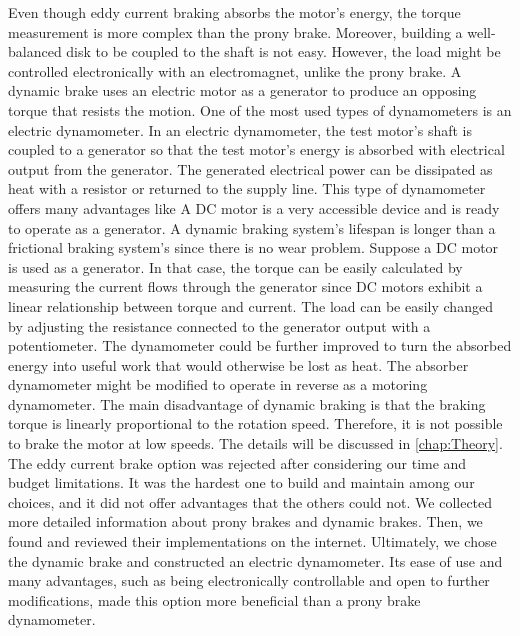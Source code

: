 {}Even though eddy current braking absorbs the motor's energy, the torque measurement is more complex than the prony brake. Moreover, building a well-balanced disk to be coupled to the shaft is not easy. However, the load might be controlled electronically with an electromagnet, unlike the prony brake.\markdownRendererInterblockSeparator
{}\markdownRendererInterblockSeparator
{}A dynamic brake uses an electric motor as a generator to produce an opposing torque that resists the motion. One of the most used types of dynamometers is an electric dynamometer. In an electric dynamometer, the test motor's shaft is coupled to a generator so that the test motor's energy is absorbed with electrical output from the generator. The generated electrical power can be dissipated as heat with a resistor or returned to the supply line.\markdownRendererInterblockSeparator
{}This type of dynamometer offers many advantages like\markdownRendererInterblockSeparator
{}\markdownRendererUlBeginTight
\markdownRendererUlItem A DC motor is a very accessible device and is ready to operate as a generator.\markdownRendererUlItemEnd 
\markdownRendererUlItem A dynamic braking system's lifespan is longer than a frictional braking system's since there is no wear problem.\markdownRendererUlItemEnd 
\markdownRendererUlItem Suppose a DC motor is used as a generator. In that case, the torque can be easily calculated by measuring the current flows through the generator since DC motors exhibit a linear relationship between torque and current.\markdownRendererUlItemEnd 
\markdownRendererUlItem The load can be easily changed by adjusting the resistance connected to the generator output with a potentiometer.\markdownRendererUlItemEnd 
\markdownRendererUlItem The dynamometer could be further improved to turn the absorbed energy into useful work that would otherwise be lost as heat.\markdownRendererUlItemEnd 
\markdownRendererUlItem The absorber dynamometer might be modified to operate in reverse as a motoring dynamometer.\markdownRendererUlItemEnd 
\markdownRendererUlEndTight \markdownRendererInterblockSeparator
{}The main disadvantage of dynamic braking is that the braking torque is linearly proportional to the rotation speed. Therefore, it is not possible to brake the motor at low speeds. The details will be discussed in \autoref{chap:Theory}.\markdownRendererInterblockSeparator
{}\markdownRendererInterblockSeparator
{}The eddy current brake option was rejected after considering our time and budget limitations. It was the hardest one to build and maintain among our choices, and it did not offer advantages that the others could not.\markdownRendererInterblockSeparator
{}We collected more detailed information about prony brakes and dynamic brakes. Then, we found and reviewed their implementations on the internet. Ultimately, we chose the dynamic brake and constructed an electric dynamometer. Its ease of use and many advantages, such as being electronically controllable and open to further modifications, made this option more beneficial than a prony brake dynamometer.\markdownRendererDocumentEnd